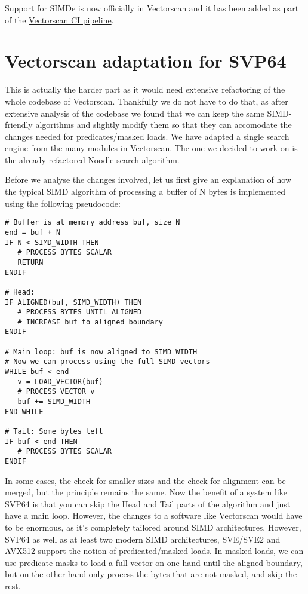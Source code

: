 Support for SIMDe is now officially in Vectorscan and it has been added as part of the
\href{https://buildbot-ci.vectorcamp.gr/#/grid}{Vectorscan CI pipeline}.
\par

\section{Vectorscan adaptation for \acrshort{SVP64}}

This is actually the harder part as it would need extensive refactoring of the whole codebase of Vectorscan.
Thankfully we do not have to do that, as after extensive analysis of the codebase we found that we can keep the same \acrshort{SIMD}-friendly algorithms
and slightly modify them so that they can accomodate the changes needed for predicates/masked loads.
We have adapted a single search engine from the many modules in Vectorscan.
The one we decided to work on is the already refactored Noodle search algorithm.
\par

Before we analyse the changes involved, let us first give an explanation of how the typical \acrshort{SIMD} algorithm
of processing a buffer of N bytes is implemented using the following pseudocode:

\begin{verbatim}
# Buffer is at memory address buf, size N
end = buf + N
IF N < SIMD_WIDTH THEN
   # PROCESS BYTES SCALAR
   RETURN
ENDIF

# Head:
IF ALIGNED(buf, SIMD_WIDTH) THEN
   # PROCESS BYTES UNTIL ALIGNED
   # INCREASE buf to aligned boundary
ENDIF

# Main loop: buf is now aligned to SIMD_WIDTH
# Now we can process using the full SIMD vectors
WHILE buf < end
   v = LOAD_VECTOR(buf)
   # PROCESS VECTOR v
   buf += SIMD_WIDTH
END WHILE

# Tail: Some bytes left
IF buf < end THEN
   # PROCESS BYTES SCALAR
ENDIF
\end{verbatim}

In some cases, the check for smaller sizes and the check for alignment can be merged, but the principle remains the same.
Now the benefit of a system like \acrshort{SVP64} is that you can skip the Head and Tail parts of the algorithm and just have a main loop.
However, the changes to a software like Vectorscan would have to be enormous, as it's completely tailored around \acrshort{SIMD} architectures.
However, \acrshort{SVP64} as well as at least two modern \acrshort{SIMD} architectures,
\acrshort{SVE}/\acrshort{SVE2} and \acrshort{AVX512} support the notion of predicated/masked loads.
In masked loads, we can use predicate masks to load a full vector on one hand until the aligned boundary,
but on the other hand only process the bytes that are not masked, and skip the rest.
\par

